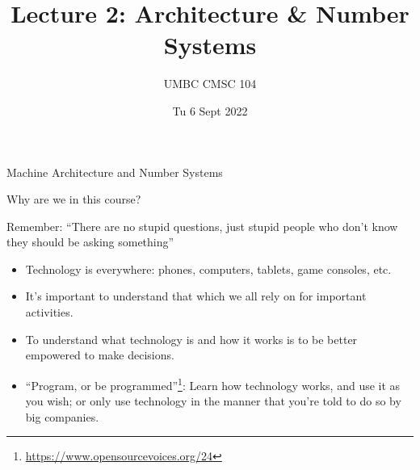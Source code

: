 \documentclass[graphics]{beamer}
\title{Lecture 2: Architecture \& Number Systems}
\author{UMBC CMSC 104}
\date{Tu 6 Sept 2022}
\begin{document}
\begin{frame}{}
\centering
    Machine Architecture and Number Systems
\end{frame}

\frame{\tableofcontents}

\begin{frame}{Why are we in this course?}
     {
        
        \newline
        Remember: ``There are no stupid questions, just stupid people who don't know they should be asking something''
    }
     {
        \begin{itemize}
            \item Technology is everywhere: phones, computers, tablets, game consoles, etc.
            \item It's important to understand that which we all rely on for important activities.
            \item To understand what technology is and how it works is to be better empowered to make decisions.
            \item ``Program, or be programmed''\footnote{\url{https://www.opensourcevoices.org/24}}: Learn how technology works, and use it as you wish; or only use technology in the manner that you're told to do so by big companies.
        \end{itemize}
    }
\end{frame}

\end{document}
